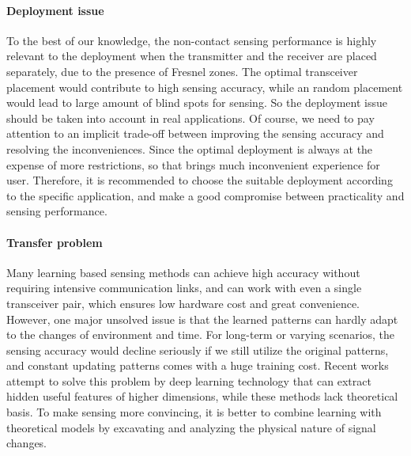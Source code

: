\paragraph*{Deployment issue} To the best of our knowledge, the non-contact sensing performance is highly relevant to the deployment when the transmitter and the receiver are placed separately, due to the presence of Fresnel zones. The optimal transceiver placement would contribute to high sensing accuracy, while an random placement would lead to large amount of blind spots for sensing. So the deployment issue should be taken into account in real applications. Of course, we need to pay attention to an implicit trade-off between improving the sensing accuracy and resolving the inconveniences. Since the optimal deployment is always at the expense of more restrictions, so that brings much inconvenient experience for user. Therefore, it is recommended to choose the suitable deployment according to the specific application, and make a good compromise between practicality and sensing performance.

\paragraph*{Transfer problem} Many learning based sensing methods can achieve high accuracy without requiring intensive communication links, and can work with even a single transceiver pair, which ensures low hardware cost and great convenience. However, one major unsolved issue is that the learned patterns can hardly adapt to the changes of environment and time. For long-term or varying scenarios, the sensing accuracy would decline seriously if we still utilize the original patterns, and constant updating patterns comes with a huge training cost. Recent works attempt to solve this problem by deep learning technology that can extract hidden useful features of higher dimensions, while these methods lack theoretical basis. To make sensing more convincing, it is better to combine learning with theoretical models by excavating and analyzing the physical nature of signal changes.

